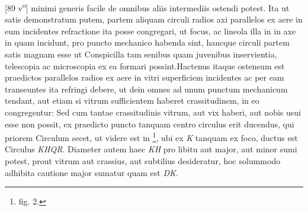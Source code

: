[89 v\textsuperscript{o}]  minimi generis facile de omnibus aliis intermediis ostendi  potest. Ita ut satis demonstratum putem, partem aliquam  circuli radios axi parallelos ex aere in eum incidentes  refractione ita posse congregari, ut focus\protect{}, ac lineola illa in  in axe in quam incidunt, pro puncto mechanico\protect{} habenda sint,  hancque circuli partem satis magnam esse ut Conspicilla\protect{}  tam senibus quam juvenibus inservientia, telescopia\protect{} ac microscopia\protect{} ex ea formari possint.\pend \pstart  Hactenus itaque ostensum est praedictos parallelos radios ex  aere in vitri superficiem incidentes ac per eam transeuntes  ita refringi debere, ut dein omnes ad unum punctum mechanicum\protect{}  tendant, aut etiam si vitrum sufficientem haberet crassitudinem,  in eo congregentur: Sed cum tantae crassitudinis vitrum, aut  vix haberi, aut nobis usui esse non possit, ex praedicto puncto  tanquam centro circulus erit ducendus, qui priorem Circulum  secet, ut videre est in \footnote{fig. 2.}, ubi ex \textit{K} tanquam  ex foco\protect{}, ductus est Circulus \textit{KHQR}. Diameter autem  haec \textit{KH} pro libitu aut major, aut minor sumi potest, prout  vitrum aut crassius, aut subtilius desideratur, hoc solummodo  adhibita cautione major sumatur quam est \textit{DK}.\pend \pstart 